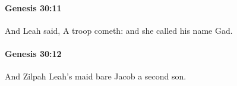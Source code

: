 		\paragraph{Genesis 30:11} %
			\label{GENESIS-30-11}

			And Leah said, A troop cometh: and she called his name Gad.


		\paragraph{Genesis 30:12} %
			\label{GENESIS-30-12}

			And Zilpah Leah's maid bare Jacob a second son.


